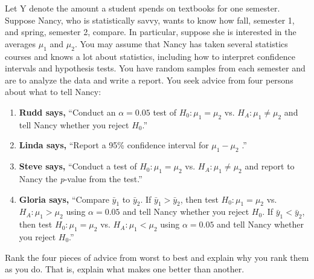 Let Y denote the amount a student spends on textbooks for one semester. Suppose Nancy, who is statistically savvy, wants to know how fall, semester 1, and spring, semester 2, compare. In particular, suppose she is interested in the averages $\mu_1$ and $\mu_2$. You may assume that Nancy has taken several statistics courses and knows a lot about statistics, including how to interpret confidence intervals and hypothesis tests. You have random samples from each semester and are to analyze the data and write a report. You seek advice from four persons about what to tell Nancy:





\begin{enumerate}[leftmargin=1cm, itemsep=.2em]


\item \textbf{Rudd says,} ``Conduct an $\alpha=0.05$ test of $H_0: \mu_1=\mu_2$ vs. $H_A: \mu_1 \neq \mu_2$ and tell Nancy whether you reject $H_0$.''





\item \textbf{Linda says,} ``Report a 95\% confidence interval for $\mu_1 - \mu_2$ .''








\item \textbf{Steve says,} ``Conduct a test of $H_0: \mu_1=\mu_2$ vs. $H_A: \mu_1 \neq \mu_2$ and report to Nancy the \textit{p}-value from the test.''





\item \textbf{Gloria says,} ``Compare $\bar{y}_1$ to $\bar{y}_2$. If $\bar{y}_1 > \bar{y}_2$, then test $H_0: \mu_1=\mu_2$ vs. $H_A: \mu_1 > \mu_2$ using $\alpha =0.05$ and tell Nancy whether you reject $H_0$. If $\bar{y}_1 < \bar{y}_2$, then test $H_0: \mu_1=\mu_2$ vs. $H_A: \mu_1 < \mu_2$ using $\alpha = 0.05$ and tell Nancy whether you reject $H_0$.''


\end{enumerate}





Rank the four pieces of advice from worst to best and explain why you rank them as you do. That is, explain what makes one better than another.








